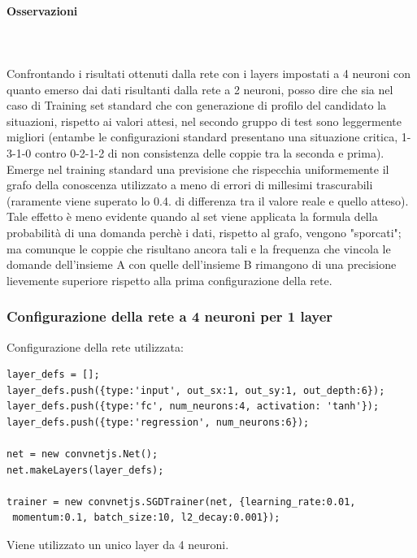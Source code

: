 \paragraph{Osservazioni}\mbox{}
\label{Osservazioni su rete a 2 neuroni per ciascuno dei 2 layers}
\\\\
\noindent
Confrontando i risultati ottenuti dalla rete con i layers impostati a 4 neuroni con quanto emerso dai dati risultanti dalla  rete a 2 neuroni, posso dire che sia nel caso di Training set standard che con generazione di profilo del candidato la situazioni, rispetto ai valori attesi, nel secondo gruppo di test sono leggermente migliori (entambe le configurazioni standard presentano una situazione critica, 1-3-1-0 contro 0-2-1-2 di non consistenza delle coppie tra la seconda e prima).\\
Emerge nel training standard una previsione che rispecchia uniformemente il grafo della conoscenza utilizzato a meno di errori di millesimi trascurabili (raramente viene superato lo 0.4. di differenza tra il valore reale e quello atteso). Tale effetto \`e meno evidente quando al set viene applicata la formula della probabilit\`a di una domanda perch\`e i dati, rispetto al grafo, vengono "sporcati"; ma comunque le coppie che risultano ancora tali e la frequenza che vincola le domande dell'insieme A con quelle dell'insieme B rimangono di una precisione lievemente superiore rispetto alla prima configurazione della rete.


\subsubsection{Configurazione della rete a 4 neuroni per 1 layer}
\label{Configurazione della rete a 4 neuroni per 1 layer}

Configurazione della rete utilizzata:\\
\begin{verbatim}layer_defs = [];
layer_defs.push({type:'input', out_sx:1, out_sy:1, out_depth:6});
layer_defs.push({type:'fc', num_neurons:4, activation: 'tanh'});
layer_defs.push({type:'regression', num_neurons:6});

net = new convnetjs.Net();
net.makeLayers(layer_defs);

trainer = new convnetjs.SGDTrainer(net, {learning_rate:0.01,
 momentum:0.1, batch_size:10, l2_decay:0.001});
\end{verbatim}
\noindent
Viene utilizzato un unico layer da 4 neuroni.

